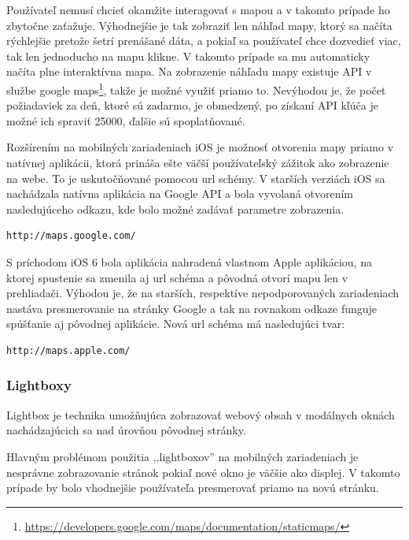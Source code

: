 Používateľ nemusí chcieť okamžite interagovať s mapou a v takomto prípade ho zbytočne zaťažuje. Výhodnejšie je tak zobraziť len náhľad mapy, ktorý sa načíta rýchlejšie pretože šetrí prenášané dáta, a pokiaľ sa používateľ chce dozvedieť viac, tak len jednoducho na mapu klikne. V takomto prípade sa mu automaticky načíta plne interaktívna mapa. Na zobrazenie náhľadu mapy existuje API v službe google maps\footnote{\url{https://developers.google.com/maps/documentation/staticmaps/}}, takže je možné využiť priamo to. Nevýhodou je, že počet požiadaviek za deň, ktoré sú zadarmo, je obmedzený, po získaní API kľúča je možné ich spraviť 25000, ďalšie sú spoplatňované.

Rozšírením na mobilných zariadeniach iOS je možnosť otvorenia mapy priamo v natívnej aplikácii, ktorá prináša ešte väčší používateľský zážitok ako zobrazenie na webe. To je uskutočňované pomocou url schémy. V starších verziách iOS sa nachádzala natívna aplikácia na Google API a bola vyvolaná otvorením nasledujúceho odkazu, kde bolo možné zadávať parametre zobrazenia.

\begin{verbatim}
http://maps.google.com/
\end{verbatim}

S príchodom iOS 6 bola aplikácia nahradená vlastnom Apple aplikáciou, na ktorej spustenie sa zmenila aj url schéma a pôvodná otvorí mapu len v prehliadači. Výhodou je, že na starších, respektíve nepodporovaných zariadeniach nastáva presmerovanie na stránky Google a tak na rovnakom odkaze funguje spúšťanie aj pôvodnej aplikácie. Nová url schéma má nasledujúci tvar:

\begin{verbatim}
http://maps.apple.com/
\end{verbatim}



\subsubsection{Lightboxy} %
\label{subsub:lightboxy}

Lightbox je technika umožňujúca zobrazovať webový obsah v modálnych oknách nachádzajúcich sa nad úrovňou pôvodnej stránky.

Hlavným problémom použitia ,,lightboxov'' na mobilných zariadeniach je nesprávne zobrazovanie stránok pokiaľ nové okno je väčšie ako displej. V takomto prípade by bolo vhodnejšie používateľa presmerovať priamo na novú stránku.

